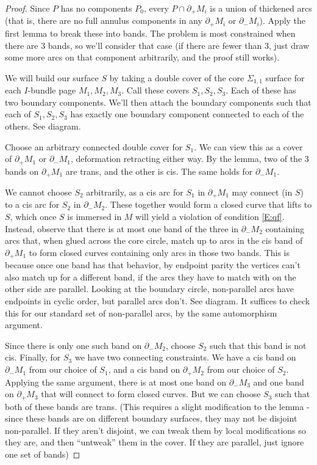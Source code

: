 \documentclass[12pt]{amsart}
\theoremstyle{definition}
\newcommand{\bd}{\partial}
\newcommand{\Si}{\Sigma}
\begin{document}
\begin{proof}

Since $P$ has no components $P_0$, every $P \cap \bd_+M_i$ is a union of
thickened arcs (that is, there are no full annulus components in any $\bd_+M_i$
or $\bd_-M_i$). Apply the first lemma to break these into bands. The problem is
most constrained when there are 3 bands, so we'll consider that case (if there
are fewer than 3, just draw some more arcs on that component arbitrarily, and
the proof still works).

We will build our surface $S$ by taking a double cover of the core $\Si_{1,1}$
surface for each $I$-bundle page $M_1,M_2,M_3$. Call these covers
$S_1,S_2,S_3$.  Each of these has two boundary components. We'll then attach
the boundary components such that each of $S_1,S_2,S_3$ has exactly one
boundary component connected to each of the others. See diagram.

Choose an arbitrary connected double cover for $S_1$. We can view this as
a cover of $\bd_+M_1$ or $\bd_-M_1$, deformation retracting either way. By the
lemma, two of the
3 bands on $\bd_+M_1$ are trans, and the other is cis. The same holds for
  $\bd_-M_1$.

We cannot choose $S_2$ arbitrarily, as a cis arc for $S_1$ in $\bd_+M_1$ may
connect (in $S$) to a cis arc for $S_2$ in $\bd_-M_2$. These together would
form a closed curve that lifts to $S$, which once $S$ is immersed in $M$ will
yield a violation of condition \eqref{E:qf}. Instead, observe that there is at
most one band of the three in $\bd_-M_2$ containing arcs that, when glued
across the core circle, match up to arcs in the cis band of $\bd_+M_1$ to form
closed curves containing only arcs in those two bands. This is because once one
band has that behavior, by endpoint parity the vertices can't also match up for
a different band, if the arcs they have to match with on the other side are
parallel. Looking at the boundary circle, non-parallel arcs have endpoints in
cyclic order, but parallel arcs don't. See diagram. It suffices to check this
for our standard set of non-parallel arcs, by the same automorphism argument.

Since there is only one such band on $\bd_-M_2$, choose $S_2$ such that this
band is not cis.  Finally, for $S_3$ we have two connecting constraints. We
have a cis band on $\bd_-M_1$ from our choice of $S_1$, and a cis band on
$\bd_+M_2$ from our choice of $S_2$.  Applying the same argument, there is at
most one band on $\bd_-M_3$ and one band on $\bd_+M_3$ that will connect to
form closed curves. But we can choose $S_3$ such that both of these bands are
trans. (This requires a slight modification to the lemma - since these bands
are on different boundary surfaces, they may not be disjoint non-parallel. If
they aren't disjoint, we can tweak them by local modifications so they are, and
then ``untweak'' them in the cover. If they are parallel, just ignore one set
of bands)


\end{proof}
\end{document}
